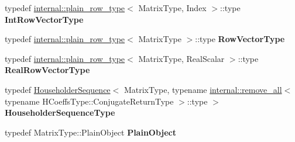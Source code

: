 \begin{DoxyCompactItemize}
\item 
\mbox{\label{class_eigen_1_1_complete_orthogonal_decomposition_acc44ac642c48935fe0da40c25035aa86}} 
typedef \mbox{\hyperlink{struct_eigen_1_1internal_1_1plain__row__type}{internal\+::plain\+\_\+row\+\_\+type}}$<$ Matrix\+Type, Index $>$\+::type {\bfseries Int\+Row\+Vector\+Type}
\item 
\mbox{\label{class_eigen_1_1_complete_orthogonal_decomposition_a7034cb4035db5e3d7c538c27c3d15212}} 
typedef \mbox{\hyperlink{struct_eigen_1_1internal_1_1plain__row__type}{internal\+::plain\+\_\+row\+\_\+type}}$<$ Matrix\+Type $>$\+::type {\bfseries Row\+Vector\+Type}
\item 
\mbox{\label{class_eigen_1_1_complete_orthogonal_decomposition_aa14f4af8219de2dcd8a1c43546d9dd4a}} 
typedef \mbox{\hyperlink{struct_eigen_1_1internal_1_1plain__row__type}{internal\+::plain\+\_\+row\+\_\+type}}$<$ Matrix\+Type, Real\+Scalar $>$\+::type {\bfseries Real\+Row\+Vector\+Type}
\item 
\mbox{\label{class_eigen_1_1_complete_orthogonal_decomposition_a9d4e0e44ac23ad8baf0f91e91b982dec}} 
typedef \mbox{\hyperlink{class_eigen_1_1_householder_sequence}{Householder\+Sequence}}$<$ Matrix\+Type, typename \mbox{\hyperlink{struct_eigen_1_1internal_1_1remove__all}{internal\+::remove\+\_\+all}}$<$ typename H\+Coeffs\+Type\+::\+Conjugate\+Return\+Type $>$\+::type $>$ {\bfseries Householder\+Sequence\+Type}
\item 
\mbox{\label{class_eigen_1_1_complete_orthogonal_decomposition_a4db9c08da38e11bd598ed743061966b1}} 
typedef Matrix\+Type\+::\+Plain\+Object {\bfseries Plain\+Object}
\end{DoxyCompactItemize}
